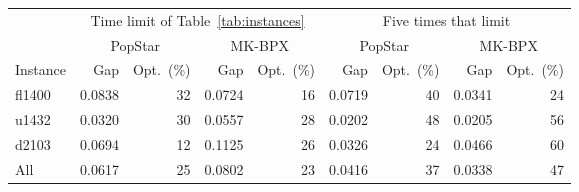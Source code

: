 \begin{tabular}{lrrrrrrrr}
\toprule
 & \multicolumn{4}{c}{Time limit of Table~\ref{tab:instances}} & \multicolumn{4}{c}{Five times that limit} \\
\cmidrule(lr){2-5}\cmidrule(lr){6-9}
 & \multicolumn{2}{c}{PopStar} & \multicolumn{2}{c}{MK-BPX} & \multicolumn{2}{c}{PopStar} & \multicolumn{2}{c}{MK-BPX} \\
Instance & Gap & Opt.\ (\%) & Gap & Opt.\ (\%) & Gap & Opt.\ (\%) & Gap & Opt.\ (\%) \\
\midrule
fl1400 & 0.0838 & 32 & 0.0724 & 16 & 0.0719 & 40 & 0.0341 & 24 \\
u1432 & 0.0320 & 30 & 0.0557 & 28 & 0.0202 & 48 & 0.0205 & 56 \\
d2103 & 0.0694 & 12 & 0.1125 & 26 & 0.0326 & 24 & 0.0466 & 60 \\
\midrule
All & 0.0617 & 25 & 0.0802 & 23 & 0.0416 & 37 & 0.0338 & 47 \\
\bottomrule
\end{tabular}
